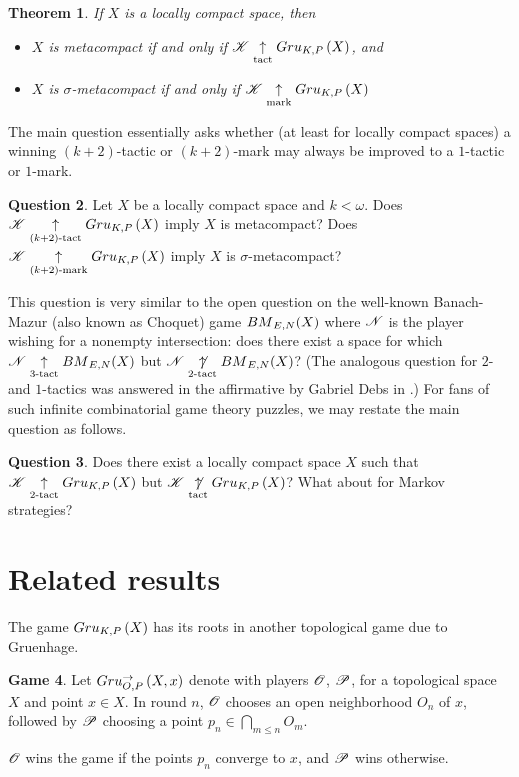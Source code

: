 \documentclass{amsart}
\newtheorem{theorem}{Theorem}[section]
\theoremstyle{definition}
\newtheorem{game}[theorem]{Game}
\newtheorem{question}[theorem]{Question}
\begin{document}
\begin{theorem}
  If $X$ is a locally compact space, then
  \begin{itemize}
    \item
    $X$ is metacompact if and only if $\mathscr{K}\underset{\text{tact}}{\uparrow}Gru_{K,P}\left({X}\right)$, and
    \item
    $X$ is $\sigma$-metacompact if and only if $\mathscr{K}\underset{\text{mark}}{\uparrow}Gru_{K,P}\left({X}\right)$
  \end{itemize}
\end{theorem}

The main question essentially asks whether (at least for locally compact
spaces) a winning $(k+2)$-tactic or $(k+2)$-mark may always be improved to a
$1$-tactic or $1$-mark.

\begin{question}
  Let $X$ be a locally compact space and $k<\omega$.
  Does $\mathscr{K}\underset{(k+2)\text{-tact}}{\uparrow}Gru_{K,P}\left({X}\right)$ imply $X$ is metacompact?
  Does $\mathscr{K}\underset{(k+2)\text{-mark}}{\uparrow}Gru_{K,P}\left({X}\right)$ imply $X$ is $\sigma$-metacompact?
\end{question}

This question is very similar to the open question on the well-known
Banach-Mazur (also known as Choquet) game ${BM}_{E,N}(X)$ where $\mathscr{N}$
is the player wishing for a nonempty intersection: does there exist a
space for which
$\mathscr{N}\underset{3\text{-tact}}{\uparrow}{BM}_{E,N}(X)$ but $\mathscr{N}\underset{2\text{-tact}}{\not\uparrow}{BM}_{E,N}(X)$?
(The analogous question for $2$- and $1$-tactics was answered in the
affirmative by Gabriel Debs in \cite{MR817083}.) For fans
of such infinite combinatorial game theory puzzles, we may restate the
main question as follows.

\begin{question}
  Does there exist a locally compact space $X$ such that
  $\mathscr{K}\underset{2\text{-tact}}{\uparrow}Gru_{K,P}\left({X}\right)$ but $\mathscr{K}\underset{\text{tact}}{\not\uparrow}Gru_{K,P}\left({X}\right)$?
  What about for Markov strategies?
\end{question}


\section{Related results}

The game $Gru_{K,P}\left({X}\right)$ has its roots in another topological game due to
Gruenhage.

\begin{game}
  Let $Gru_{O,P}^{\to}\left({X},{x}\right)$ denote  with
  players $\mathscr{O}$, $\mathscr{P}$, for a topological space $X$ and point $x\in X$.
  In round $n$, $\mathscr{O}$ chooses an open neighborhood $O_n$ of $x$, followed
  by $\mathscr{P}$ choosing a point $p_n\in \bigcap_{m\leq n}O_m$.

  $\mathscr{O}$ wins the game if the points $p_n$ converge to $x$, and $\mathscr{P}$
  wins otherwise.
\end{game}
\end{document}
